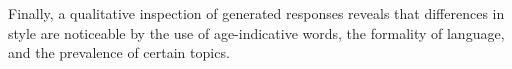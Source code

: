 Finally, a qualitative inspection of generated responses reveals that differences in style are noticeable by the use of age-indicative words, the formality of language, and the prevalence of certain topics.

